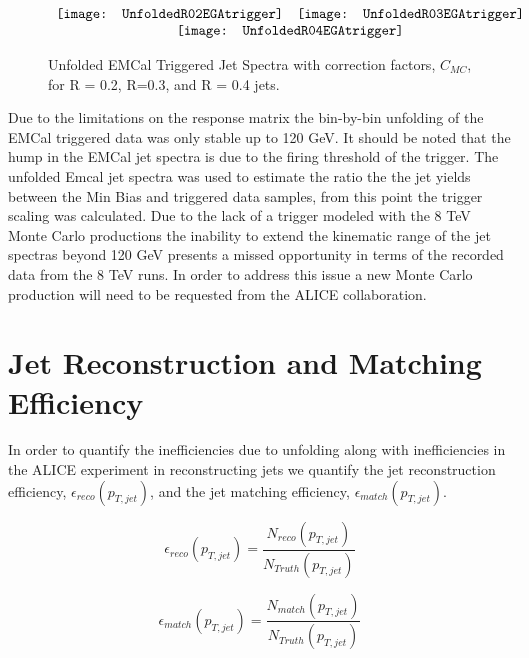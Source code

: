 \begin{figure*}[t!]
$\begin{array}{rl}
    \texttt{[image: UnfoldedR02EGAtrigger]} &
    \texttt{[image: UnfoldedR03EGAtrigger]}\\
    \multicolumn{2}{c}{\texttt{[image: UnfoldedR04EGAtrigger]}}
\end{array}$
\caption[Corrected EMCal Triggered Jet Spectra to Monte Carlo level for R = 0.2, R=0.3, and R = 0.4 jets.]{\label{fig:unfoldEGA}Unfolded EMCal Triggered Jet Spectra with correction factors, $C_{MC}$, for R = 0.2, R=0.3, and R = 0.4 jets.}
\end{figure*}

\noindent
Due to the limitations on the response matrix the bin-by-bin unfolding of the EMCal triggered data was only stable up to 120 GeV.  It should be noted that the hump in the EMCal jet spectra is due to the firing threshold of the trigger.  The unfolded Emcal jet spectra was used to estimate the ratio the the jet yields between the Min Bias and triggered data samples, from this point the trigger scaling was calculated.  Due to the lack of a trigger modeled with the 8 TeV Monte Carlo productions the inability to extend the kinematic range of the jet spectras beyond 120 GeV presents a missed opportunity in terms of the recorded data from the 8 TeV runs.  In order to address this issue a new Monte Carlo production will need to be requested from the ALICE collaboration.

\section{Jet Reconstruction and Matching Efficiency}
In order to quantify the inefficiencies due to unfolding along with inefficiencies in the ALICE experiment in reconstructing jets we quantify the jet reconstruction efficiency, $\epsilon_{reco} (p_{T, jet})$, and the jet matching efficiency, $\epsilon_{match} (p_{T, jet})$.

\begin{equation}
 \epsilon_{reco} (p_{T, jet}) = \frac{N_{reco}(p_{T, jet}) }{N_{Truth} (p_{T, jet})}
\label{eq:jetrecoeff}
\end{equation}

\begin{equation}
 \epsilon_{match} (p_{T, jet}) = \frac{N_{match}(p_{T, jet}) }{N_{Truth}(p_{T, jet})}
\label{eq:jetmatchoeff}
\end{equation}

